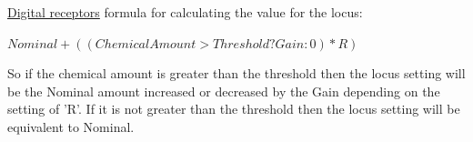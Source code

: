 \documentclass[11pt,twoside,a4paper]{article}
\begin{document}
\underline{Digital receptors} formula for calculating the value for the locus:

$Nominal + ((ChemicalAmount > Threshold ? Gain : 0) * R)$

So if the chemical amount is greater than the threshold then the locus setting will be the Nominal amount increased or decreased by the Gain depending on the setting of 'R'. If it is not greater than the threshold then the locus setting will be equivalent to Nominal.~\\


\end{document}
